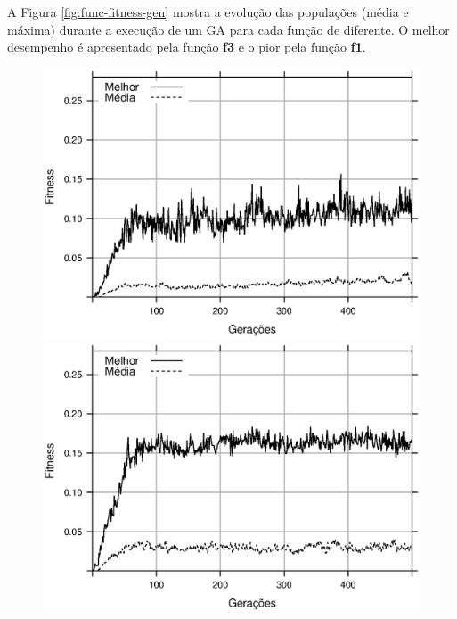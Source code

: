 A Figura \ref{fig:func-fitness-gen} mostra a evolução das populações (\fitness média e máxima) durante a execução de um GA para cada função de \fitness diferente. O melhor desempenho é apresentado pela função \textbf{f3} e o pior pela função \textbf{f1}.

\begin{figure}[h]
    \centering
    \begin{minipage}{.5\textwidth}
        \includegraphics[width=\textwidth]{figures/fitness-f1}
    \end{minipage}%
    \begin{minipage}{.5\textwidth}
        \includegraphics[width=\textwidth]{figures/fitness-f2}
    \end{minipage}


\end{figure}
